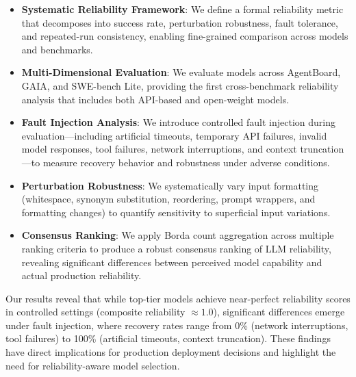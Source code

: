 \begin{itemize}
    \item \textbf{Systematic Reliability Framework}: We define a formal reliability metric that decomposes into success rate, perturbation robustness, fault tolerance, and repeated-run consistency, enabling fine-grained comparison across models and benchmarks.

    \item \textbf{Multi-Dimensional Evaluation}: We evaluate models across AgentBoard, GAIA, and SWE-bench Lite, providing the first cross-benchmark reliability analysis that includes both API-based and open-weight models.

    \item \textbf{Fault Injection Analysis}: We introduce controlled fault injection during evaluation---including artificial timeouts, temporary API failures, invalid model responses, tool failures, network interruptions, and context truncation---to measure recovery behavior and robustness under adverse conditions.

    \item \textbf{Perturbation Robustness}: We systematically vary input formatting (whitespace, synonym substitution, reordering, prompt wrappers, and formatting changes) to quantify sensitivity to superficial input variations.

    \item \textbf{Consensus Ranking}: We apply Borda count aggregation across multiple ranking criteria to produce a robust consensus ranking of LLM reliability, revealing significant differences between perceived model capability and actual production reliability.
\end{itemize}

Our results reveal that while top-tier models achieve near-perfect reliability scores in controlled settings (composite reliability $\approx 1.0$), significant differences emerge under fault injection, where recovery rates range from 0\% (network interruptions, tool failures) to 100\% (artificial timeouts, context truncation). These findings have direct implications for production deployment decisions and highlight the need for reliability-aware model selection.
